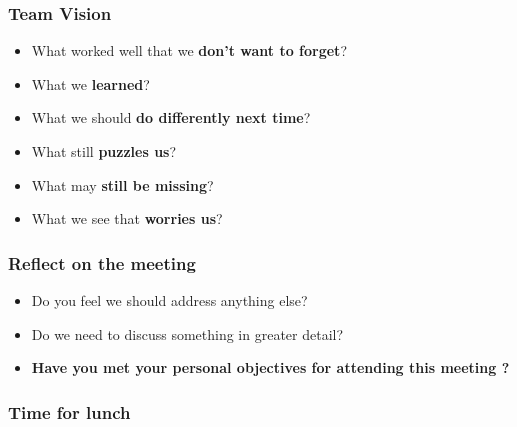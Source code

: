 \documentclass{beamer}
\begin{document}
\begin{frame}
\frametitle{Team Vision}

\begin{itemize}
    \item What worked well that we \textbf{don't want to forget}?
    \item What we \textbf{learned}?
    \item What we should \textbf{do differently next time}?
    \item What still \textbf{puzzles us}?
    \item What may \textbf{still be missing}?
    \item What we see that \textbf{worries us}?
\end{itemize}
\bigbreak
{}
\end{frame}

\begin{frame}
\frametitle{Reflect on the meeting}

\begin{itemize}
    \item Do you feel we should address anything else?
    \item Do we need to discuss something in greater detail?
    \item \textbf{Have you met your personal objectives for attending this meeting ?}
\end{itemize}
\end{frame}

\begin{frame}
\frametitle{Time for lunch}

\end{frame}
\end{document}
